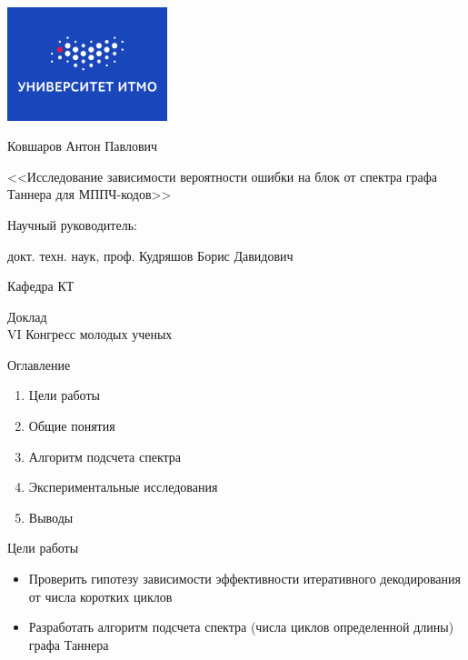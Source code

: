 \documentclass[t,13pt,graphics=pdflatex,xcolor=table,aspectratio=43]{beamer}
\begin{document}
\begingroup
{}
\begin{frame}[plain]
\color{white}
\centering\bfseries
\includegraphics[width=0.35\textwidth]{itmo_small_blue_rus.png}

{\Large Ковшаров Антон Павлович \par}

\vspace{0pt plus 0.3filll}

{\large {<<}Исследование зависимости вероятности ошибки на блок от спектра 
            графа Таннера для МППЧ-кодов{>>}}

\vspace{0pt plus 0.3filll}

{\small Научный руководитель:\par
 докт. техн. наук, проф. Кудряшов Борис Давидович}

\vspace{0pt plus 0.3filll}

{\small Кафедра КТ \hfill } 

\vspace{0pt plus 1filll}
\end{frame}
\endgroup

\begin{frame}{Доклад \\ VI Конгресс молодых ученых}
\begin{block}{Оглавление}
\begin{enumerate}
    \item Цели работы
    \item Общие понятия 
    \item Алгоритм подсчета спектра
    \item Экспериментальные исследования
    \item Выводы
\end{enumerate}
\end{block}
\end{frame}

\begin{frame}{Цели работы}
\begin{itemize}
  \item Проверить гипотезу зависимости эффективности итеративного декодирования от числа коротких циклов
  \item Разработать алгоритм подсчета спектра (числа циклов определенной длины) графа Таннера
\end{itemize}
\end{frame}
\end{document}
